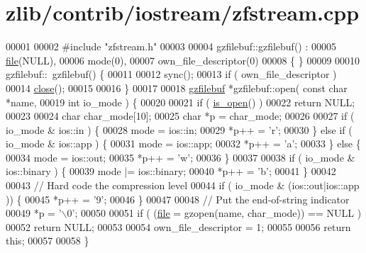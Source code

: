 \hypertarget{zlib_2contrib_2iostream_2zfstream_8cpp_source}{}\section{zlib/contrib/iostream/zfstream.cpp}
\label{zlib_2contrib_2iostream_2zfstream_8cpp_source}

\begin{DoxyCode}
00001 
00002 \textcolor{preprocessor}{#include "zfstream.h"}
00003 
00004 gzfilebuf::gzfilebuf() :
00005   \hyperlink{structfile}{file}(NULL),
00006   mode(0),
00007   own\_file\_descriptor(0)
00008 \{ \}
00009 
00010 gzfilebuf::~gzfilebuf() \{
00011 
00012   sync();
00013   \textcolor{keywordflow}{if} ( own\_file\_descriptor )
00014     \hyperlink{classgzofstream_a59e8b01e1c9741085f18ca456c4b8f54}{close}();
00015 
00016 \}
00017 
00018 \hyperlink{classgzfilebuf}{gzfilebuf} *gzfilebuf::open( \textcolor{keyword}{const} \textcolor{keywordtype}{char} *name,
00019                             \textcolor{keywordtype}{int} io\_mode ) \{
00020 
00021   \textcolor{keywordflow}{if} ( \hyperlink{classgzofstream_acb1c9c6dccaf41bc5e44c2263ea48de3}{is\_open}() )
00022     \textcolor{keywordflow}{return} NULL;
00023 
00024   \textcolor{keywordtype}{char} char\_mode[10];
00025   \textcolor{keywordtype}{char} *p = char\_mode;
00026 
00027   \textcolor{keywordflow}{if} ( io\_mode & ios::in ) \{
00028     mode = ios::in;
00029     *p++ = \textcolor{charliteral}{'r'};
00030   \} \textcolor{keywordflow}{else} \textcolor{keywordflow}{if} ( io\_mode & ios::app ) \{
00031     mode = ios::app;
00032     *p++ = \textcolor{charliteral}{'a'};
00033   \} \textcolor{keywordflow}{else} \{
00034     mode = ios::out;
00035     *p++ = \textcolor{charliteral}{'w'};
00036   \}
00037 
00038   \textcolor{keywordflow}{if} ( io\_mode & ios::binary ) \{
00039     mode |= ios::binary;
00040     *p++ = \textcolor{charliteral}{'b'};
00041   \}
00042 
00043   \textcolor{comment}{// Hard code the compression level}
00044   \textcolor{keywordflow}{if} ( io\_mode & (ios::out|ios::app )) \{
00045     *p++ = \textcolor{charliteral}{'9'};
00046   \}
00047 
00048   \textcolor{comment}{// Put the end-of-string indicator}
00049   *p = \textcolor{charliteral}{'\(\backslash\)0'};
00050 
00051   \textcolor{keywordflow}{if} ( (\hyperlink{structfile}{file} = gzopen(name, char\_mode)) == NULL )
00052     \textcolor{keywordflow}{return} NULL;
00053 
00054   own\_file\_descriptor = 1;
00055 
00056   \textcolor{keywordflow}{return} \textcolor{keyword}{this};
00057 
00058 \}

\end{DoxyCode}
